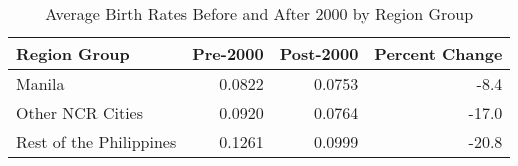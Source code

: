 \begin{table}[!h]
\centering
\caption{Average Birth Rates Before and After 2000 by Region Group}
\centering
\begin{tabular}[t]{lrrr}
\toprule
Region Group & Pre-2000 & Post-2000 & Percent Change\\
\midrule
Manila & 0.0822 & 0.0753 & -8.4\\
Other NCR Cities & 0.0920 & 0.0764 & -17.0\\
Rest of the Philippines & 0.1261 & 0.0999 & -20.8\\
\bottomrule
\end{tabular}
\end{table}
